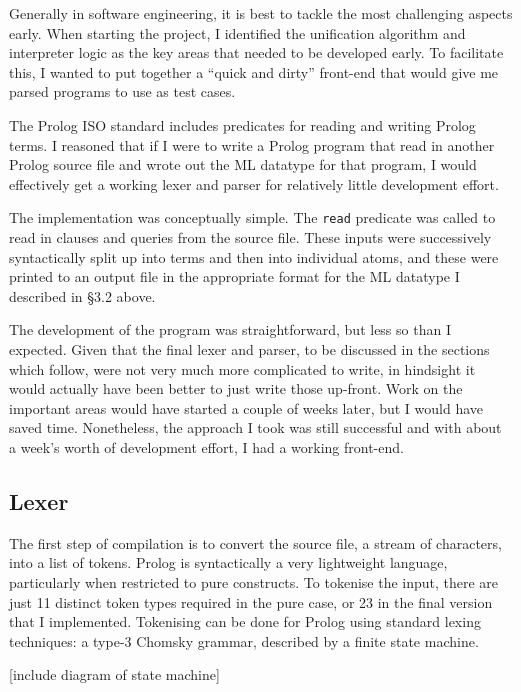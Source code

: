 \documentclass[12pt]{article}
\begin{document}
Generally in software engineering, it is best to tackle the most challenging aspects early. 
When starting the project, I identified the unification algorithm and interpreter logic as the key areas that needed to be developed early. 
To facilitate this, I wanted to put together a ``quick and dirty'' front-end that would give me parsed programs to use as test cases.

The Prolog ISO standard includes predicates for reading and writing Prolog terms. 
I reasoned that if I were to write a Prolog program that read in another Prolog source file and wrote out the ML datatype for that program, I would effectively get a working lexer and parser for relatively little development effort. 

The implementation was conceptually simple. 
The \verb|read| predicate was called to read in clauses and queries from the source file. 
These inputs were successively syntactically split up into terms and then into individual atoms, and these were printed to an output file in the appropriate format for the ML datatype I described in \S3.2 above.

The development of the program was straightforward, but less so than I expected. 
Given that the final lexer and parser, to be discussed in the sections which follow, were not very much more complicated to write, in hindsight it would actually have been better to just write those up-front. 
Work on the important areas would have started a couple of weeks later, but I would have saved time.
Nonetheless, the approach I took was still successful and with about a week's worth of development effort, I had a working front-end.

\subsection{Lexer}

The first step of compilation is to convert the source file, a stream of characters, into a list of tokens. 
Prolog is syntactically a very lightweight language, particularly when restricted to pure constructs. 
To tokenise the input, there are just 11 distinct token types required in the pure case, or 23 in the final version that I implemented. 
Tokenising can be done for Prolog using standard lexing techniques: a type-3 Chomsky grammar, described by a finite state machine. 

[include diagram of state machine]
\end{document}
